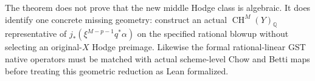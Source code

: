 \documentclass[11pt]{article}
\newcommand{\Q}{\mathbb Q}
\newcommand{\CH}{\operatorname{CH}}
\begin{document}
The theorem does not prove that the new middle Hodge class is
algebraic. It does identify one concrete missing geometry:
construct an actual $\CH^M(Y)_{\Q}$ representative of
$j_*(\xi^{M-p-1}q^*\alpha)$ on the specified rational blowup
without selecting an original-$X$ Hodge preimage.
Likewise the formal rational-linear GST native operators
must be matched with actual scheme-level Chow and Betti maps
before treating this geometric reduction as Lean formalized.
\end{document}
